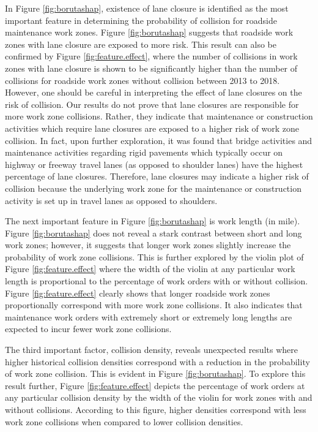 \documentclass[10pt,a4paper]{article}
\begin{document}
In Figure \ref{fig:borutashap}, existence of lane closure is identified as the most important feature in determining the probability of collision for roadside maintenance work zones. Figure \ref{fig:borutashap} suggests that roadside work zones with lane closure are exposed to more risk. This result can also be confirmed by Figure \ref{fig:feature.effect}, where the number of collisions in work zones with lane closure is shown to be significantly higher than the number of collisions for roadside work zones without collision between 2013 to 2018. However, one should be careful in interpreting the effect of lane closures on the risk of collision. Our results do not prove that lane closures are responsible for more work zone collisions. Rather, they indicate that maintenance or construction activities which require lane closures are exposed to a higher risk of work zone collision. In fact, upon further exploration, it was found that bridge activities and maintenance activities regarding rigid pavements which typically occur on highway or freeway travel lanes (as opposed to shoulder lanes) have the highest percentage of lane closures. Therefore, lane closures may indicate a higher risk of collision because the underlying work zone for the maintenance or construction activity is set up in travel lanes as opposed to shoulders. 

The next important feature in Figure \ref{fig:borutashap} is work length (in mile). Figure \ref{fig:borutashap} does not reveal a stark contrast between short and long work zones; however, it suggests that longer work zones slightly increase the probability of work zone collisions. This is further explored by the violin plot of Figure \ref{fig:feature.effect} where the width of the violin at any particular work length is proportional to the percentage of work orders with or without collision. Figure \ref{fig:feature.effect} clearly shows that longer roadside work zones proportionally correspond with more work zone collisions. It also indicates that maintenance work orders with extremely short or extremely long lengths are expected to incur fewer work zone collisions.

The third important factor, collision density, reveals unexpected results where higher historical collision densities correspond with a reduction in the probability of work zone collision. This is evident in Figure \ref{fig:borutashap}. To explore this result further, Figure \ref{fig:feature.effect} depicts the percentage of work orders at any particular collision density by the width of the violin for work zones with and without collisions. According to this figure, higher densities correspond with less work zone collisions when compared to lower collision densities.
\end{document}
